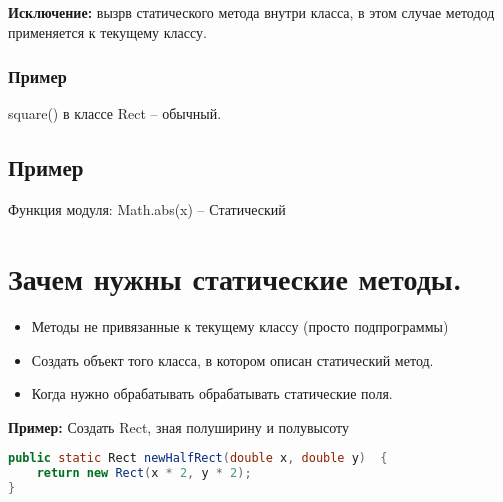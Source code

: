 \documentclass{scrartcl}
\begin{document}
\textbf{Исключение: } вызрв статического метода внутри класса, в этом случае методод применяется к текущему классу.
\subsubsection{Пример}
square() в классе Rect -- обычный.
\subsection{Пример}
Функция модуля: Math.abs(x) -- Статический
\section{Зачем нужны статические методы.}
\begin{itemize}
    \item Методы не привязанные к текущему классу (просто подпрограммы)
    \item Создать объект того класса, в котором описан статический метод.
    \item Когда нужно обрабатывать обрабатывать статические поля.
\end{itemize}
\textbf{Пример: } Создать Rect, зная полуширину и полувысоту
\begin{lstlisting}[language=Java] 
public static Rect newHalfRect(double x, double y)  {
    return new Rect(x * 2, y * 2);
}
\end{lstlisting} 
\end{document}
